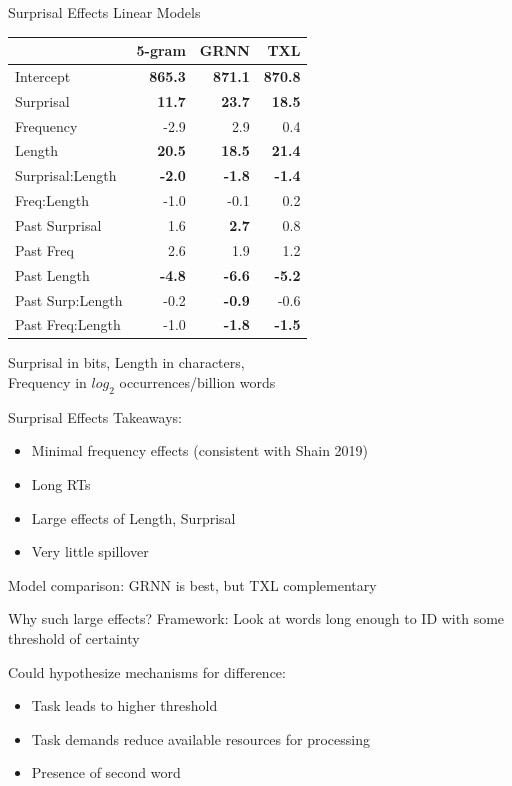 \documentclass[12pt, xcolor=beamer,table,usenames,dvipsnames, ignorenonframetext, ngerman,t]{beamer}
\begin{document}
\begin{frame}{Surprisal Effects}
	Linear Models \\
	\pause
	
	\begin{small}
		\begin{tabular}{l|r|r|r}
			\hline
			&5-gram & GRNN & TXL\\
			\hline
			Intercept & \textbf{865.3} & \textbf{871.1} & \textbf{870.8} \\ 
			Surprisal & \textbf{11.7}  & \textbf{23.7} & \textbf{18.5}  \\ 
			Frequency & -2.9  & 2.9  & 0.4  \\ 
			Length & \textbf{20.5} & \textbf{18.5}  & \textbf{21.4} \\ 
			Surprisal:Length & \textbf{-2.0}  & \textbf{-1.8}  & \textbf{-1.4} \\
			Freq:Length & -1.0  & -0.1 & 0.2  \\ 
			\hline
			Past Surprisal & 1.6  & \textbf{2.7} & 0.8 \\ 
			Past Freq & 2.6  & 1.9  & 1.2  \\ 
			Past Length & \textbf{-4.8}  & \textbf{-6.6 }&\textbf{ -5.2} \\ 
			Past Surp:Length & -0.2 & \textbf{-0.9} & -0.6  \\ 
			Past Freq:Length & -1.0  & \textbf{-1.8 }&   \textbf{-1.5}  \\ 
			\hline
		\end{tabular}
	
	Surprisal in bits, Length in characters, \\
	Frequency in $log_2$ occurrences/billion words
	\end{small}

\end{frame}
\begin{frame}{Surprisal Effects}
	Takeaways: \pause
	\begin{itemize}
		\item Minimal frequency effects (consistent with Shain 2019) \pause
		\item Long RTs \pause
		\item Large effects of Length, Surprisal \pause
		\item Very little spillover \pause
	\end{itemize}
	
	Model comparison: GRNN is best, but TXL complementary
\end{frame}

\begin{frame}{Why such large effects?}
	\pause
	Framework: Look at words long enough to ID with some threshold of certainty \pause
	
Could hypothesize mechanisms for difference: \pause
\begin{itemize}
	\item Task leads to higher threshold \pause 
	\item Task demands reduce available resources for processing \pause
	\item Presence of second word 
\end{itemize}

\end{frame}
\end{document}
